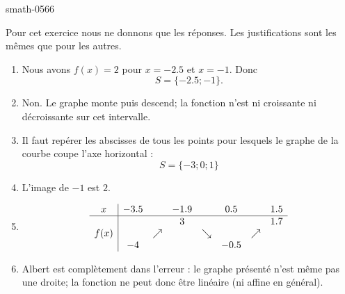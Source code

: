 
\begin{corrige}{smath-0566}

    Pour cet exercice nous ne donnons que les réponses. Les justifications sont les mêmes que pour les autres.

    \begin{enumerate}
        \item
            Nous avons \( f(x)=2\) pour \( x=-2.5\) et \( x=-1\). Donc 
            \begin{equation}
                S=\{ -2.5;-1 \}.
            \end{equation}
        \item
            Non. Le graphe monte puis descend; la fonction n'est ni croissante ni décroissante sur cet intervalle.
        \item
            Il faut repérer les abscisses de tous les points pour lesquels le graphe de la courbe coupe l'axe horizontal :
            \begin{equation}
                S=\{ -3;0;1 \}
            \end{equation}
        \item
            L'image de \( -1\) est \( 2\).
        \item
            \begin{equation*}
                \begin{array}[]{c|ccccccc}
                    x&-3.5&&-1.9&&0.5&&1.5\\
                    \hline
                    &&&3&&&&1.7\\
                    f(x)&&\nearrow&&\searrow&&\nearrow&\\
                    &-4&&&&-0.5&&\\
                \end{array}
            \end{equation*}
        \item
            Albert est complètement dans l'erreur : le graphe présenté n'est même pas une droite; la fonction ne peut donc être linéaire (ni affine en général).
    \end{enumerate}

\end{corrige}
